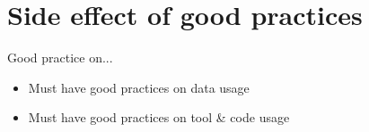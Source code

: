 \section{Side effect of good practices}
\begin{frame}
\begin{block}{Good practice on...}
\begin{itemize}
\item Must have good practices on data usage
\item Must have good practices on tool & code usage
\end{itemize}
\end{block}


\end{frame}
\begin{frame}
\end{frame}

